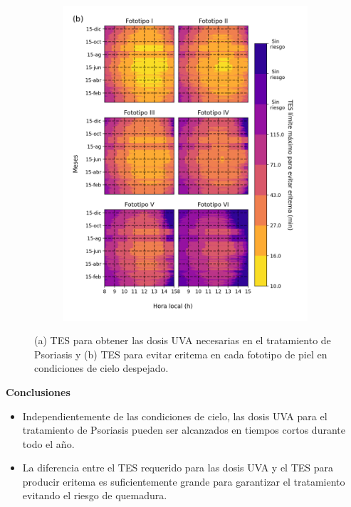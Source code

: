 \documentclass{article}
\begin{document}
\begin{multicols}{2}
\begin{figure}[H]
\begin{subfigure}[H]{0.4\linewidth}
        \includegraphics[scale=0.38]{images/ery.png}
    \end{subfigure}
\caption{(a) TES para obtener las dosis UVA necesarias en el tratamiento de Psoriasis y 
(b) TES para evitar eritema en cada fototipo de piel en condiciones de cielo despejado.}
\end{figure}
\begin{center}
\begin{shaded}
\textbf{\textcolor{na}{Conclusiones}}
\end{shaded}
\end{center}
\begin{itemize}
    \item Independientemente de las condiciones de cielo, las dosis UVA para el tratamiento de Psoriasis pueden ser alcanzados en tiempos cortos durante todo el año.
    \item La diferencia entre el TES requerido para las dosis UVA y el TES para producir eritema es suficientemente grande para garantizar el tratamiento evitando el riesgo de quemadura.

\end{itemize}
\end{multicols}
\end{document}
